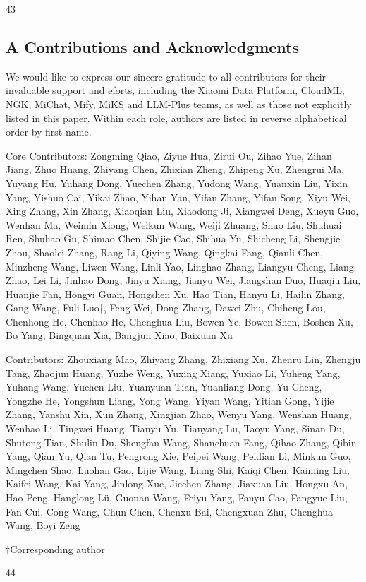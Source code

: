 \documentclass[
  10
]{article}
\begin{document}
43

\subsection{A Contributions and
Acknowledgments}\label{a-contributions-and-acknowledgments}

We would like to express our sincere gratitude to all contributors for
their invaluable support and eforts, including the Xiaomi Data Platform,
CloudML, NGK, MiChat, Mify, MiKS and LLM-Plus teams, as well as those
not explicitly listed in this paper. Within each role, authors are
listed in reverse alphabetical order by first name.

Core Contributors: Zongming Qiao, Ziyue Hua, Zirui Ou, Zihao Yue, Zihan
Jiang, Zhuo Huang, Zhiyang Chen, Zhixian Zheng, Zhipeng Xu, Zhengrui Ma,
Yuyang Hu, Yuhang Dong, Yuechen Zhang, Yudong Wang, Yuanxin Liu, Yixin
Yang, Yishuo Cai, Yikai Zhao, Yihan Yan, Yifan Zhang, Yifan Song, Xiyu
Wei, Xing Zhang, Xin Zhang, Xiaoqian Liu, Xiaodong Ji, Xiangwei Deng,
Xueyu Guo, Wenhan Ma, Weimin Xiong, Weikun Wang, Weiji Zhuang, Shuo Liu,
Shuhuai Ren, Shuhao Gu, Shimao Chen, Shijie Cao, Shihua Yu, Shicheng Li,
Shengjie Zhou, Shaolei Zhang, Rang Li, Qiying Wang, Qingkai Fang, Qianli
Chen, Minzheng Wang, Liwen Wang, Linli Yao, Linghao Zhang, Liangyu
Cheng, Liang Zhao, Lei Li, Jinhao Dong, Jinyu Xiang, Jianyu Wei,
Jiangshan Duo, Huaqiu Liu, Huanjie Fan, Hongyi Guan, Hongshen Xu, Hao
Tian, Hanyu Li, Hailin Zhang, Gang Wang, Fuli Luo†, Feng Wei, Dong
Zhang, Dawei Zhu, Chiheng Lou, Chenhong He, Chenhao He, Chenghua Liu,
Bowen Ye, Bowen Shen, Boshen Xu, Bo Yang, Bingquan Xia, Bangjun Xiao,
Baixuan Xu

Contributors: Zhouxiang Mao, Zhiyang Zhang, Zhixiang Xu, Zhenru Lin,
Zhengju Tang, Zhaojun Huang, Yuzhe Weng, Yuxing Xiang, Yuxiao Li, Yuheng
Yang, Yuhang Wang, Yuchen Liu, Yuanyuan Tian, Yuanliang Dong, Yu Cheng,
Yongzhe He, Yongshun Liang, Yong Wang, Yiyan Wang, Yitian Gong, Yijie
Zhang, Yanshu Xin, Xun Zhang, Xingjian Zhao, Wenyu Yang, Wenshan Huang,
Wenhao Li, Tingwei Huang, Tianyu Yu, Tianyang Lu, Taoyu Yang, Sinan Du,
Shutong Tian, Shulin Du, Shengfan Wang, Shanchuan Fang, Qihao Zhang,
Qibin Yang, Qian Yu, Qian Tu, Pengrong Xie, Peipei Wang, Peidian Li,
Minkun Guo, Mingchen Shao, Luohan Gao, Lijie Wang, Liang Shi, Kaiqi
Chen, Kaiming Liu, Kaifei Wang, Kai Yang, Jinlong Xue, Jiechen Zhang,
Jiaxuan Liu, Hongxu An, Hao Peng, Hanglong Lü, Guonan Wang, Feiyu Yang,
Fanyu Cao, Fangyue Liu, Fan Cui, Cong Wang, Chun Chen, Chenxu Bai,
Chengxuan Zhu, Chenghua Wang, Boyi Zeng

†Corresponding author

44
\end{document}
